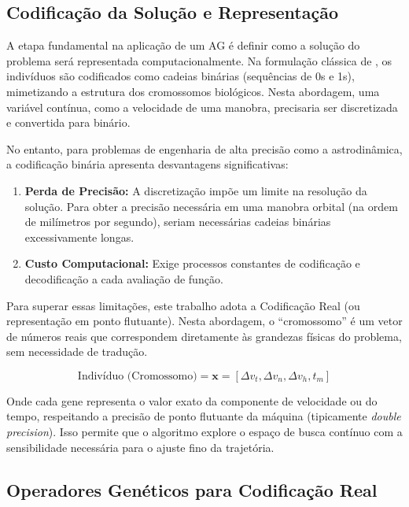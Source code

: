 \subsection{Codificação da Solução e Representação}

A etapa fundamental na aplicação de um AG é definir como a solução do problema será representada computacionalmente. Na formulação clássica de , os indivíduos são codificados como cadeias binárias (sequências de 0s e 1s), mimetizando a estrutura dos cromossomos biológicos. Nesta abordagem, uma variável contínua, como a velocidade de uma manobra, precisaria ser discretizada e convertida para binário.

No entanto, para problemas de engenharia de alta precisão como a astrodinâmica, a codificação binária apresenta desvantagens significativas:
\begin{enumerate}
    \item \textbf{Perda de Precisão:} A discretização impõe um limite na resolução da solução. Para obter a precisão necessária em uma manobra orbital (na ordem de milímetros por segundo), seriam necessárias cadeias binárias excessivamente longas.
    \item \textbf{Custo Computacional:} Exige processos constantes de codificação e decodificação a cada avaliação de função.
\end{enumerate}

Para superar essas limitações, este trabalho adota a Codificação Real (ou representação em ponto flutuante). Nesta abordagem, o ``cromossomo'' é um vetor de números reais que correspondem diretamente às grandezas físicas do problema, sem necessidade de tradução.

\begin{equation}
    \text{Indivíduo (Cromossomo)} = \mathbf{x} = [\Delta v_t, \Delta v_n, \Delta v_h, t_m]
\end{equation}

Onde cada gene representa o valor exato da componente de velocidade ou do tempo, respeitando a precisão de ponto flutuante da máquina (tipicamente \textit{double precision}). Isso permite que o algoritmo explore o espaço de busca contínuo com a sensibilidade necessária para o ajuste fino da trajetória.

\subsection{Operadores Genéticos para Codificação Real}

